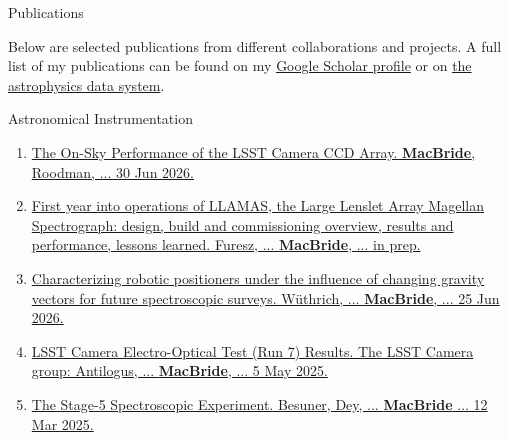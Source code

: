 \documentclass{resume} %
\begin{document}
\begin{rSection}{Publications}


Below are selected publications from different collaborations and projects. A full list of my publications can be found on my \href{https://scholar.google.com/citations?user=XtRTswUAAAAJ&hl=en}{Google Scholar profile} or on \href{https://ui.adsabs.harvard.edu/search/fq=\%7B!type\%3Daqp\%20v\%3D\%24fq_database\%7D&fq_database=(database\%3Aastronomy\%20OR\%20database\%3Aphysics)&p_=0&q=((\%20author\%3A\%22Macbride\%2C\%20Sean\%22)\%20AND\%20year\%3A2019-2150)&sort=date\%20desc\%2C\%20bibcode\%20desc}{the astrophysics data system}.

\begin{rSubsection}{Astronomical Instrumentation}{}{}{}
\begin{enumerate}
    \item \href{https://arxiv.org/abs/2606.31806}{The On-Sky Performance of the LSST Camera CCD Array. \textbf{MacBride}, Roodman, ... 30 Jun 2026.}
    \item \href{}{First year into operations of LLAMAS, the Large Lenslet Array Magellan Spectrograph: design, build and commissioning overview, results and performance, lessons learned. Furesz, ... \textbf{MacBride}, ... in prep.}
    \item  \href{https://arxiv.org/pdf/2606.26821}{Characterizing robotic positioners under the influence of changing gravity vectors for future spectroscopic surveys. Wüthrich, ... \textbf{MacBride}, ... 25 Jun 2026.} 
    \item \href{https://sitcomtn-148.lsst.io/}{LSST Camera Electro-Optical Test (Run 7) Results. The LSST Camera group: Antilogus, ... \textbf{MacBride}, ... 5 May 2025.}
    \item \href{https://arxiv.org/abs/2503.07923}{The Stage-5 Spectroscopic Experiment. Besuner, Dey, ... \textbf{MacBride} ... 12 Mar 2025.}    
\end{enumerate}
\end{rSubsection}


\end{rSection}
\end{document}
